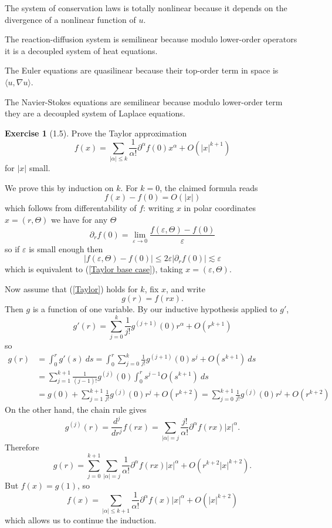 \documentclass[10pt]{article}
\theoremstyle{definition}
\newtheorem{exer}{Exercise}
\begin{document}
The system of conservation laws is totally nonlinear because it depends on the divergence of a nonlinear function of $u$.

The reaction-diffusion system is semilinear because modulo lower-order operators it is a decoupled system of heat equations.

The Euler equations are quasilinear because their top-order term in space is $\langle u, \nabla u\rangle$.

The Navier-Stokes equations are semilinear because modulo lower-order term they are a decoupled system of Laplace equations.


\begin{exer}[1.5]
Prove the Taylor approximation
\begin{equation}
\label{Taylor}
f(x) = \sum_{|\alpha| \leq k} \frac{1}{\alpha!} \partial^\alpha f(0) x^\alpha + O(|x|^{k+1})
\end{equation}
for $|x|$ small.
\end{exer}

We prove this by induction on $k$. For $k = 0$, the claimed formula reads
\begin{equation}
\label{Taylor base case}
f(x) - f(0) = O(|x|)\end{equation}
which follows from differentability of $f$: writing $x$ in polar coordinates $x = (r, \Theta)$ we have for any $\Theta$
$$\partial_r f(0) = \lim_{\varepsilon \to 0} \frac{f(\varepsilon, \Theta) - f(0)}{\varepsilon}$$
so if $\varepsilon$ is small enough then
$$|f(\varepsilon, \Theta) - f(0)| \leq 2\varepsilon|\partial_r f(0)| \lesssim \varepsilon$$
which is equivalent to (\ref{Taylor base case}), taking $x = (\varepsilon, \Theta)$.

Now assume that (\ref{Taylor}) holds for $k$, fix $x$, and write
$$g(r) = f(rx).$$
Then $g$ is a function of one variable. By our inductive hypothesis applied to $g'$,
$$g'(r) = \sum_{j=0}^k \frac{1}{j!} g^{(j+1)}(0) r^\alpha + O(r^{k+1})$$
so
\begin{align*}
g(r) &= \int_0^r g'(s)~ds = \int_0^r \sum_{j=0}^k \frac{1}{j!} g^{(j+1)}(0) s^j + O(s^{k+1})~ds\\
& = \sum_{j=1}^{k+1} \frac{1}{(j-1)!} g^{(j)}(0) \int_0^r s^{j-1}O(s^{k+1})~ds
\\&= g(0) + \sum_{j=1}^{k+1} \frac{1}{j!} g^{(j)}(0) r^j + O(r^{k+2}) = \sum_{j=0}^{k+1} \frac{1}{j!} g^{(j)}(0) r^j + O(r^{k+2})
\end{align*}
On the other hand, the chain rule gives
$$g^{(j)}(r) = \frac{d^j}{dr^j} f(rx) = \sum_{|\alpha| = j} \frac{j!}{\alpha!} \partial^\alpha f(rx) |x|^\alpha.$$
Therefore
$$g(r) = \sum_{j=0}^{k+1} \sum_{|\alpha| = j} \frac{1}{\alpha!} \partial^\alpha f(rx) |x|^\alpha + O(r^{k+2}|x|^{k+2}).$$
But $f(x) = g(1)$, so
$$f(x) = \sum_{|\alpha| \leq k+1} \frac{1}{\alpha!} \partial^\alpha f(x) |x|^\alpha + O(|x|^{k + 2})$$
which allows us to continue the induction.
\end{document}
